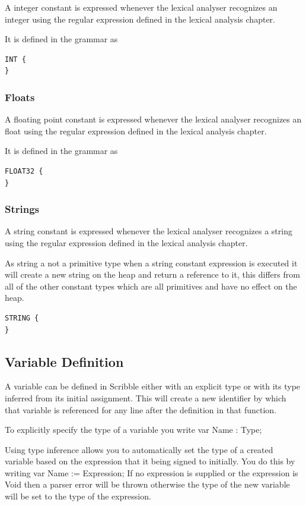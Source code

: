 \documentclass[]{final_report}
\begin{document}
A integer constant is expressed whenever the lexical analyser recognizes an integer using the regular expression defined in the lexical analysis chapter.

It is defined in the grammar as
\begin{verbatim}
INT {
}
\end{verbatim}

\subsubsection{Floats}

A floating point constant is expressed whenever the lexical analyser recognizes an float using the regular expression defined in the lexical analysis chapter.

It is defined in the grammar as
\begin{verbatim}
FLOAT32 {
}
\end{verbatim}

\subsubsection{Strings}

A string constant is expressed whenever the lexical analyser recognizes a string using the regular expression defined in the lexical analysis chapter.

As string a not a primitive type when a string constant expression is executed it will create a new string on the heap and return a reference to it, this differs from all of the other constant types which are all primitives and have no effect on the heap.

\begin{verbatim}
STRING {
}
\end{verbatim}

\subsection{Variable Definition}

A variable can be defined in Scribble either with an explicit type or with its type inferred from its initial assignment. This will create a new identifier by which that variable is referenced for any line after the definition in that function.

To explicitly specify the type of a variable you write var Name : Type;

Using type inference allows you to automatically set the type of a created variable based on the expression that it being signed to initially. You do this by writing var Name := Expression; If no expression is supplied or the expression is Void then a parser error will be thrown otherwise the type of the new variable will be set to the type of the expression.
\end{document}
